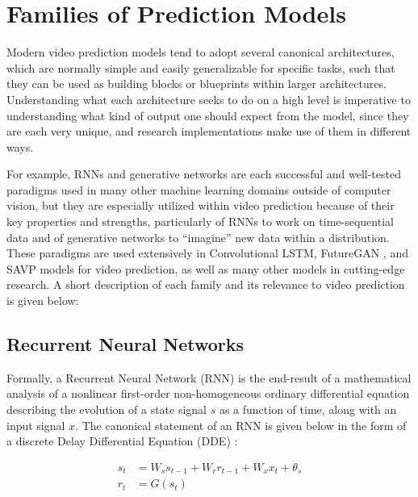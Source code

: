\documentclass{scrartcl}
\begin{document}
\section{Families of Prediction Models}
\label{sec:families}

Modern video prediction models tend to adopt several canonical architectures,
which are normally simple and easily generalizable for specific tasks, such
that they can be used as building blocks or blueprints within larger
architectures. Understanding what each architecture seeks to do on a high level
is imperative to understanding what kind of output one should expect from the
model, since they are each very unique, and research implementations make use
of them in different ways.

For example, RNNs and generative networks are each successful and well-tested
paradigms used in many other machine learning domains outside of computer
vision, but they are especially utilized within video prediction because of
their key properties and strengths, particularly of RNNs to work on
time-sequential data and of generative networks to ``imagine'' new data within
a distribution. These paradigms are used extensively in Convolutional LSTM,
FutureGAN \cite{futuregan}, and SAVP models \cite{savp} for video prediction,
as well as many other models in cutting-edge research. A short description of
each family and its relevance to video prediction is given below:

\subsection{Recurrent Neural Networks}
\label{subsec:rnn}

Formally, a Recurrent Neural Network (RNN) is the end-result of a mathematical
analysis of a nonlinear first-order non-homogeneous ordinary differential
equation describing the evolution of a state signal $s$ as a function of time,
along with an input signal $x$. The canonical statement of an RNN is given
below in the form of a discrete Delay Differential Equation (DDE)
\cite{rnn_and_lstm_fundamentals}:

\begin{equation}
	\begin{split}
		s_t & = W_s s_{t - 1} + W_r r_{t - 1} + W_x x_t + \theta_s \\
		r_t & = G ( s_t )
	\end{split}
	\label{eq:rnn_canonical}
\end{equation}
\end{document}
